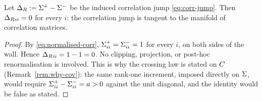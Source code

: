 \begin{corollary}\label{cor:wall-jump}
Let $\Delta_R := \Sigma^+ - \Sigma^-$ be the induced correlation jump \eqref{eq:corr-jump}. Then $\Delta_R{}_{ii} = 0$ for every $i$: the correlation jump is tangent to the manifold of correlation matrices.
\end{corollary}
\begin{proof}
By \eqref{eq:normalised-corr}, $\Sigma^+_{ii} = \Sigma^-_{ii} = 1$ for every $i$, on both sides of the wall. Hence $\Delta_R{}_{ii} = 1 - 1 = 0$. No clipping, projection, or post-hoc renormalisation is involved. This is why the crossing law is stated on $C$ (Remark~\ref{rem:why-cov}): the same rank-one increment, imposed directly on $\Sigma$, would require $\Sigma^+_{ii}-\Sigma^-_{ii}=a>0$ against the unit diagonal, and the identity would be false as stated.
\end{proof}

